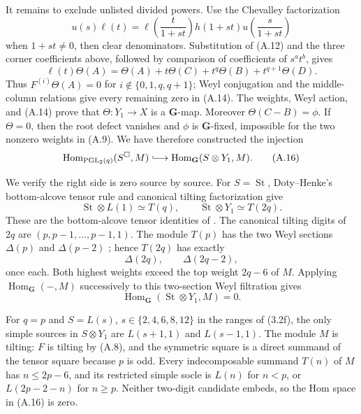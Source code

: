 \documentclass[11pt]{article}
\theoremstyle{definition}
\theoremstyle{remark}
\begin{document}
It remains to exclude unlisted divided powers.  Use the Chevalley
factorization
\[
 u(s)\ell(t)=
 \ell\!\left(\frac{t}{1+st}\right)h(1+st)
 u\!\left(\frac{s}{1+st}\right)                        \tag{A.15}
\]
when \(1+st\ne0\), then clear denominators.  Substitution of (A.12) and
the three corner coefficients above, followed by comparison of
coefficients of \(s^at^b\), gives
\[
 \ell(t)\Theta(A)=\Theta(A)+t\Theta(C)+t^q\Theta(B)
                    +t^{q+1}\Theta(D).
\]
Thus \(F^{(i)}\Theta(A)=0\) for
\(i\notin\{0,1,q,q+1\}\); Weyl conjugation and the middle-column
relations give every remaining zero in (A.14).  The weights, Weyl action,
and (A.14) prove that \(\Theta:Y_1\to X\) is a \(\mathbf G\)-map.
Moreover \(\Theta(C-B)=\phi\).  If \(\Theta=0\), then the root defect
vanishes and \(\phi\) is \(\mathbf G\)-fixed, impossible for the two
nonzero weights in (A.9).  We have therefore constructed the injection
\[
 \operatorname{Hom}_{\operatorname{PGL}_2(q)}(S^\square,M)
 \lhook\joinrel\longrightarrow
 \operatorname{Hom}_{\mathbf G}(S\otimes Y_1,M).        \tag{A.16}
\]

We verify the right side is zero source by source.  For
\(S=\operatorname{St}\), Doty--Henke's bottom-alcove tensor rule and
canonical tilting factorization give
\[
 \operatorname{St}\otimes L(1)\simeq T(q),\qquad
 \operatorname{St}\otimes Y_1\simeq T(2q).
\]
These are the bottom-alcove tensor identities of
\cite[Lemmas~1.3--1.4]{DotyHenke2002}.
The canonical tilting digits of \(2q\) are
\((p,p-1,\ldots,p-1,1)\).  The module \(T(p)\) has the two Weyl sections
\(\Delta(p)\) and \(\Delta(p-2)\)
\cite[Lemma~1.1]{DotyHenke2002}; hence \(T(2q)\) has exactly
\[
 \Delta(2q),\qquad \Delta(2q-2),                        \tag{A.17}
\]
once each.  Both highest weights exceed the top weight \(2q-6\) of \(M\).
Applying \(\operatorname{Hom}_{\mathbf G}(-,M)\) successively to this
two-section Weyl filtration gives
\[
 \operatorname{Hom}_{\mathbf G}(\operatorname{St}\otimes Y_1,M)=0.
\]

For \(q=p\) and \(S=L(s)\), \(s\in\{2,4,6,8,12\}\) in the ranges of
(3.2f), the only simple sources in \(S\otimes Y_1\) are
\(L(s+1,1)\) and \(L(s-1,1)\).  The module \(M\) is tilting:
\(F\) is tilting by (A.8), and the symmetric square is a direct summand
of the tensor square because \(p\) is odd.  Every indecomposable summand
\(T(n)\) of \(M\) has \(n\le2p-6\), and its restricted simple socle is
\(L(n)\) for \(n<p\), or \(L(2p-2-n)\) for \(n\ge p\).  Neither
two-digit candidate embeds, so the Hom space in (A.16) is zero.
\end{document}
